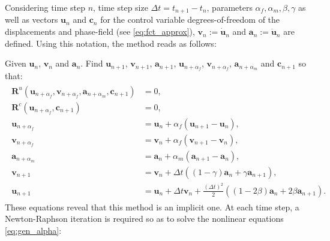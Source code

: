Considering time step $n$, time step size $\Delta t = t_{n+1}-t_{n}$, parameters $\alpha_{f},\alpha_{m},\beta,\gamma$ as well as vectors $\mathbf{u}_{n}$ and $\mathbf{c}_{n}$ for the control variable degrees-of-freedom of the displacements and phase-field (see \eqref{eq:fct_approx}), $\textbf{v}_{n}:=\dot{\mathbf{u}}_{n}$ and $\mathbf{a}_{n}:=\ddot{\mathbf{u}}_{n}$ are defined. Using this notation, the method reads as follows:

Given $\mathbf{u}_{n}$, $\mathbf{v}_{n}$ and $\mathbf{a}_{n}$. Find $\mathbf{u}_{n+1}$, $\mathbf{v}_{n+1}$, $\mathbf{a}_{n+1}$, $\mathbf{u}_{n+\alpha_{f}}$, $\mathbf{v}_{n+\alpha_{f}}$, $\mathbf{a}_{n+\alpha_{m}}$ and $\mathbf{c}_{n+1}$ so that:
\begin{equation} \label{eq:gen_alpha}
\begin{aligned}
\begin{alignedat}{1}
        \mathbf{R}^{u}\left(\mathbf{u}_{n+\alpha_{f}},\mathbf{v}_{n+\alpha_{f}},\mathbf{a}_{n+\alpha_{m}},\mathbf{c}_{n+1}\right) &= 0, \\
    	\mathbf{R}^{c}\left(\mathbf{u}_{n+\alpha_{f}},\mathbf{c}_{n+1}\right) &= 0, \\
        \mathbf{u}_{n+\alpha_{f}} &= \mathbf{u}_{n}+\alpha_{f}\left(\mathbf{u}_{n+1}-\mathbf{u}_{n}\right), \\      
        \mathbf{v}_{n+\alpha_{f}} &= \mathbf{v}_{n}+\alpha_{f}\left(\mathbf{v}_{n+1}-\mathbf{v}_{n}\right), \\
        \mathbf{a}_{n+\alpha_{m}} &= \mathbf{a}_{n}+\alpha_{m}\left(\mathbf{a}_{n+1}-\mathbf{a}_{n}\right), \\
        \mathbf{v}_{n+1} &= \mathbf{v}_{n}+\Delta t\left(\left(1-\gamma\right)\mathbf{a}_{n}+\gamma\mathbf{a}_{n+1}\right), \\  
        \mathbf{u}_{n+1} &= \mathbf{u}_{n}+\Delta t\mathbf{v}_{n}+\frac{\left(\Delta t\right)^{2}}{2}\left(\left(1-2\beta\right)\mathbf{a}_{n}+2\beta\mathbf{a}_{n+1}\right).
\end{alignedat}
\end{aligned}
\end{equation}
These equations reveal that this method is an implicit one. At each time step, a Newton-Raphson iteration is required so as to solve the nonlinear equations \eqref{eq:gen_alpha}:

